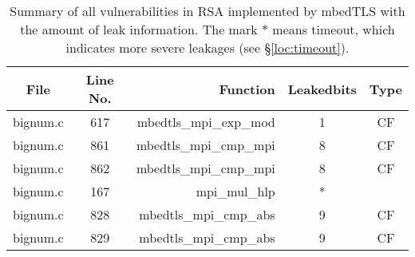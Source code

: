 \begin{table*}%
\centering
\caption{Summary of all vulnerabilities in RSA implemented by mbedTLS with the amount of leak information.
The mark $*$ means timeout,
      which indicates more severe leakages (see \S\ref{loc:timeout}).}\label{tab:RSAmbedTLS}
\begin{tabular}{ccrcc}
\hline
\textbf{File} & \textbf{Line No.} & \textbf{Function} & \textbf{Leakedbits} & \textbf{Type} \\\hline
bignum.c&617&mbedtls\_mpi\_exp\_mod&1 &CF\\
bignum.c&861&mbedtls\_mpi\_cmp\_mpi&8 &CF\\
bignum.c&862&mbedtls\_mpi\_cmp\_mpi&8 &CF\\
bignum.c&167&mpi\_mul\_hlp&*&\\
bignum.c&828&mbedtls\_mpi\_cmp\_abs&9 &CF\\
bignum.c&829&mbedtls\_mpi\_cmp\_abs&9 &CF\\
\hline
\end{tabular}
\end{table*}
